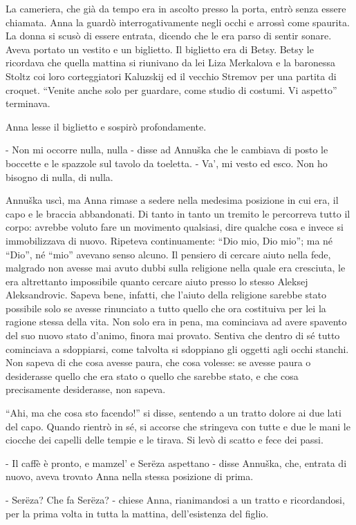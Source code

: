 La cameriera, che già da tempo era in ascolto presso la porta, entrò senza essere chiamata. Anna la guardò interrogativamente negli occhi e arrossì come spaurita. La donna si scusò di essere entrata, dicendo che le era parso di sentir sonare. Aveva portato un vestito e un biglietto. Il biglietto era di Betsy. Betsy le ricordava che quella mattina si riunivano da lei Liza Merkalova e la baronessa Stoltz coi loro corteggiatori Kaluzskij ed il vecchio Stremov per una partita di croquet. ``Venite anche solo per guardare, come studio di costumi. Vi aspetto'' terminava. 

Anna lesse il biglietto e sospirò profondamente. 

- Non mi occorre nulla, nulla - disse ad Annuška che le cambiava di posto le boccette e le spazzole sul tavolo da toeletta. - Va', mi vesto ed esco. Non ho bisogno di nulla, di nulla. 

Annuška uscì, ma Anna rimase a sedere nella medesima posizione in cui era, il capo e le braccia abbandonati. Di tanto in tanto un tremito le percorreva tutto il corpo: avrebbe voluto fare un movimento qualsiasi, dire qualche cosa e invece si immobilizzava di nuovo. Ripeteva continuamente: ``Dio mio, Dio mio''; ma né ``Dio'', né ``mio'' avevano senso alcuno. Il pensiero di cercare aiuto nella fede, malgrado non avesse mai avuto dubbi sulla religione nella quale era cresciuta, le era altrettanto impossibile quanto cercare aiuto presso lo stesso Aleksej Aleksandrovic. Sapeva bene, infatti, che l'aiuto della religione sarebbe stato possibile solo se avesse rinunciato a tutto quello che ora costituiva per lei la ragione stessa della vita. Non solo era in pena, ma cominciava ad avere spavento del suo nuovo stato d'animo, finora mai provato. Sentiva che dentro di sé tutto cominciava a sdoppiarsi, come talvolta si sdoppiano gli oggetti agli occhi stanchi. Non sapeva di che cosa avesse paura, che cosa volesse: se avesse paura o desiderasse quello che era stato o quello che sarebbe stato, e che cosa precisamente desiderasse, non sapeva. 

``Ahi, ma che cosa sto facendo!'' si disse, sentendo a un tratto dolore ai due lati del capo. Quando rientrò in sé, si accorse che stringeva con tutte e due le mani le ciocche dei capelli delle tempie e le tirava. Si levò di scatto e fece dei passi. 

- Il caffè è pronto, e mamzel' e Serëza aspettano - disse Annuška, che, entrata di nuovo, aveva trovato Anna nella stessa posizione di prima. 

- Serëza? Che fa Serëza? - chiese Anna, rianimandosi a un tratto e ricordandosi, per la prima volta in tutta la mattina, dell'esistenza del figlio. 

